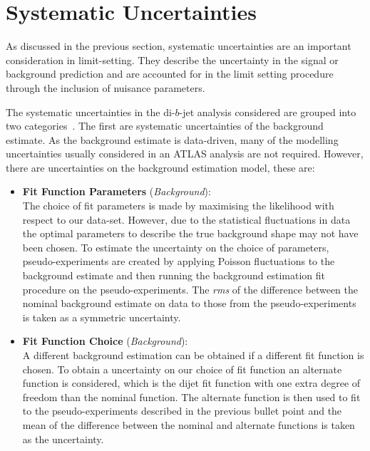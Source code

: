 \section{Systematic Uncertainties}
\label{sec:lim-syst}

As discussed in the previous section,
systematic uncertainties are an important consideration in limit-setting.
They describe the uncertainty in the signal or background prediction
and are accounted for in the limit setting procedure through the inclusion of nuisance parameters.

The systematic uncertainties in the di-$b$-jet analysis considered are grouped into two categories~\cite{dibjet-ichep_conf}.
The first are systematic uncertainties of the background estimate.
As the background estimate is data-driven,
many of the modelling uncertainties usually considered in an ATLAS analysis are not required.
However, there are uncertainties on the background estimation model, these are:

\begin{itemize}[leftmargin=*]
\item \textbf{Fit Function Parameters} \hspace{1mm} (\textit{Background}):\\
  The choice of fit parameters is made by maximising the likelihood with respect to our data-set.
  However, due to the statistical fluctuations in data the optimal parameters to describe
  the true background shape may not have been chosen.
  To estimate the uncertainty on the choice of parameters, pseudo-experiments are created by applying Poisson
  fluctuations to the background estimate and then running the background estimation fit procedure on the pseudo-experiments.
  The \textit{rms} of the difference between the nominal background estimate on data to those from the pseudo-experiments is
  taken as a symmetric uncertainty. \vspace{0.5em}
\item\textbf{Fit Function Choice}  \hspace{1mm} (\textit{Background}):\\
  A different background estimation can be obtained if a different fit function is chosen.
  To obtain a uncertainty on our choice of fit function an alternate function is considered,
  which is the dijet fit function with one extra degree of freedom than the nominal function.
  The alternate function is then used to fit to the pseudo-experiments described in the previous bullet point
  and the mean of the difference between the nominal and alternate functions is taken as the uncertainty.
  \vspace{0.5em}
\end{itemize}

